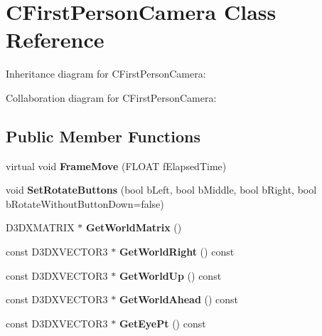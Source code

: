 \hypertarget{class_c_first_person_camera}{\section{C\+First\+Person\+Camera Class Reference}
\label{class_c_first_person_camera}
}


Inheritance diagram for C\+First\+Person\+Camera\+:


Collaboration diagram for C\+First\+Person\+Camera\+:
\subsection*{Public Member Functions}
\begin{DoxyCompactItemize}
\item 
\hypertarget{class_c_first_person_camera_a86e482e92a7a17db600e82ad9a29ca01}{virtual void {\bfseries Frame\+Move} (F\+L\+O\+A\+T f\+Elapsed\+Time)}\label{class_c_first_person_camera_a86e482e92a7a17db600e82ad9a29ca01}

\item 
\hypertarget{class_c_first_person_camera_a96068a7b6bd4cdeeedc72877dba948dc}{void {\bfseries Set\+Rotate\+Buttons} (bool b\+Left, bool b\+Middle, bool b\+Right, bool b\+Rotate\+Without\+Button\+Down=false)}\label{class_c_first_person_camera_a96068a7b6bd4cdeeedc72877dba948dc}

\item 
\hypertarget{class_c_first_person_camera_af24e375a682bac077ab06c24a22870e3}{D3\+D\+X\+M\+A\+T\+R\+I\+X $\ast$ {\bfseries Get\+World\+Matrix} ()}\label{class_c_first_person_camera_af24e375a682bac077ab06c24a22870e3}

\item 
\hypertarget{class_c_first_person_camera_a0ca46ea7c1d52786b1f149b4a12be986}{const D3\+D\+X\+V\+E\+C\+T\+O\+R3 $\ast$ {\bfseries Get\+World\+Right} () const }\label{class_c_first_person_camera_a0ca46ea7c1d52786b1f149b4a12be986}

\item 
\hypertarget{class_c_first_person_camera_adb1c6d58d95eb38416facd8217d9e565}{const D3\+D\+X\+V\+E\+C\+T\+O\+R3 $\ast$ {\bfseries Get\+World\+Up} () const }\label{class_c_first_person_camera_adb1c6d58d95eb38416facd8217d9e565}

\item 
\hypertarget{class_c_first_person_camera_ab672fff686f1f13a88997176bdd2bd04}{const D3\+D\+X\+V\+E\+C\+T\+O\+R3 $\ast$ {\bfseries Get\+World\+Ahead} () const }\label{class_c_first_person_camera_ab672fff686f1f13a88997176bdd2bd04}

\item 
\hypertarget{class_c_first_person_camera_a0191f784e950825ac77825ef5c3b6295}{const D3\+D\+X\+V\+E\+C\+T\+O\+R3 $\ast$ {\bfseries Get\+Eye\+Pt} () const }\label{class_c_first_person_camera_a0191f784e950825ac77825ef5c3b6295}

\end{DoxyCompactItemize}
